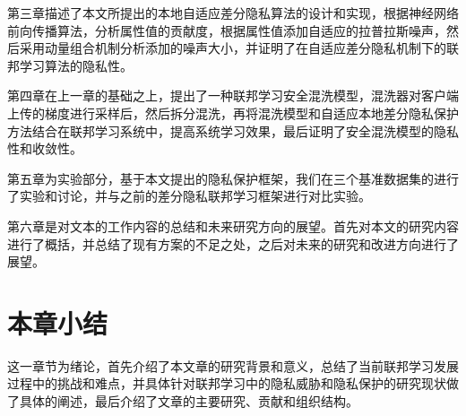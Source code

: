 第三章描述了本文所提出的本地自适应差分隐私算法的设计和实现，根据神经网络前向传播算法，分析属性值的贡献度，根据属性值添加自适应的拉普拉斯噪声，然后采用动量组合机制分析添加的噪声大小，并证明了在自适应差分隐私机制下的联邦学习算法的隐私性。
  
第四章在上一章的基础之上，提出了一种联邦学习安全混洗模型，混洗器对客户端上传的梯度进行采样后，然后拆分混洗，再将混洗模型和自适应本地差分隐私保护方法结合在联邦学习系统中，提高系统学习效果，最后证明了安全混洗模型的隐私性和收敛性。
    
第五章为实验部分，基于本文提出的隐私保护框架，我们在三个基准数据集的进行了实验和讨论，并与之前的差分隐私联邦学习框架进行对比实验。

第六章是对文本的工作内容的总结和未来研究方向的展望。首先对本文的研究内容进行了概括，并总结了现有方案的不足之处，之后对未来的研究和改进方向进行了展望。

\section{本章小结}
这一章节为绪论，首先介绍了本文章的研究背景和意义，总结了当前联邦学习发展过程中的挑战和难点，并具体针对联邦学习中的隐私威胁和隐私保护的研究现状做了具体的阐述，最后介绍了文章的主要研究、贡献和组织结构。

